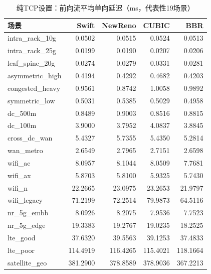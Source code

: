 \documentclass[10pt,twocolumn]{article}
\begin{document}
\begin{table}[htbp]
\centering
\caption{纯TCP设置：前向流平均单向延迟（ms，代表性19场景）}
\label{tab:latency}
\scriptsize
\setlength{\tabcolsep}{3pt}
\begin{tabular}{@{}lrrrr@{}}
\toprule
\textbf{场景} & \textbf{Swift} & \textbf{NewReno} & \textbf{CUBIC} & \textbf{BBR} \\
\midrule
intra\_rack\_10g & 0.0502 & 0.0515 & 0.0524 & 0.0513 \\
intra\_rack\_25g & 0.0199 & 0.0190 & 0.0207 & 0.0206 \\
leaf\_spine\_20g & 0.0274 & 0.0279 & 0.0331 & 0.0281 \\
\midrule
asymmetric\_high & 0.4194 & 0.4292 & 0.4682 & 0.4203 \\
congested\_heavy & 0.9561 & 0.8742 & 1.0058 & 0.9892 \\
symmetric\_low & 0.5031 & 0.5385 & 0.5029 & 0.4958 \\
dc\_500m & 0.8489 & 0.9003 & 0.8516 & 0.8815 \\
dc\_100m & 3.9000 & 3.7952 & 4.0837 & 3.8845 \\
cross\_dc\_wan & 5.4327 & 5.7355 & 5.4350 & 5.2814 \\
wan\_metro & 2.6549 & 2.7965 & 2.7151 & 2.6598 \\
\midrule
wifi\_ac & 8.0957 & 8.1044 & 8.0509 & 7.7681 \\
wifi\_ax & 5.8703 & 5.8100 & 5.9325 & 5.7430 \\
wifi\_n & 22.2665 & 23.0975 & 23.2653 & 21.9797 \\
wifi\_legacy & 71.2199 & 72.2514 & 79.9873 & 64.5116 \\
nr\_5g\_embb & 8.0926 & 8.2075 & 7.9536 & 7.7523 \\
nr\_5g\_edge & 19.3383 & 19.2767 & 19.0235 & 18.2525 \\
lte\_good & 37.6320 & 39.5563 & 39.1253 & 37.4833 \\
lte\_poor & 114.4919 & 116.4265 & 115.4021 & 118.1664 \\
\midrule
satellite\_geo & 381.2900 & 378.8589 & 378.9036 & 367.2213 \\
\bottomrule
\end{tabular}
\end{table}
\end{document}

